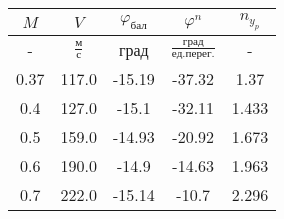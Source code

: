 \begin{tabular}{|c|c|c|c|c|}
\hline
$M$ & $V$ & $\varphi_{бал}$ & $\varphi^{n}$ & $n_{y_{p}}$ \\ 
\hline
- & $\frac{м}{с}$ & град & $\frac{град}{ед.перег.}$ & - \\ 
\hline
0.37 & 117.0 & -15.19 & -37.32 & 1.37 \\ 
\hline
0.4 & 127.0 & -15.1 & -32.11 & 1.433 \\ 
\hline
0.5 & 159.0 & -14.93 & -20.92 & 1.673 \\ 
\hline
0.6 & 190.0 & -14.9 & -14.63 & 1.963 \\ 
\hline
0.7 & 222.0 & -15.14 & -10.7 & 2.296 \\ 
\hline
\end{tabular}